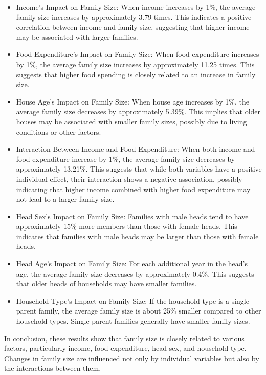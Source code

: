 \documentclass[
]{article}
\begin{document}
\begin{itemize}
\item
  Income's Impact on Family Size: When income increases by 1\%, the
  average family size increases by approximately 3.79 times. This
  indicates a positive correlation between income and family size,
  suggesting that higher income may be associated with larger families.
\item
  Food Expenditure's Impact on Family Size: When food expenditure
  increases by 1\%, the average family size increases by approximately
  11.25 times. This suggests that higher food spending is closely
  related to an increase in family size.
\item
  House Age's Impact on Family Size: When house age increases by 1\%,
  the average family size decreases by approximately 5.39\%. This
  implies that older houses may be associated with smaller family sizes,
  possibly due to living conditions or other factors.
\item
  Interaction Between Income and Food Expenditure: When both income and
  food expenditure increase by 1\%, the average family size decreases by
  approximately 13.21\%. This suggests that while both variables have a
  positive individual effect, their interaction shows a negative
  association, possibly indicating that higher income combined with
  higher food expenditure may not lead to a larger family size.
\item
  Head Sex's Impact on Family Size: Families with male heads tend to
  have approximately 15\% more members than those with female heads.
  This indicates that families with male heads may be larger than those
  with female heads.
\item
  Head Age's Impact on Family Size: For each additional year in the
  head's age, the average family size decreases by approximately 0.4\%.
  This suggests that older heads of households may have smaller
  families.
\item
  Household Type's Impact on Family Size: If the household type is a
  single-parent family, the average family size is about 25\% smaller
  compared to other household types. Single-parent families generally
  have smaller family sizes.
\end{itemize}

In conclusion, these results show that family size is closely related to
various factors, particularly income, food expenditure, head sex, and
household type. Changes in family size are influenced not only by
individual variables but also by the interactions between them.
\end{document}
